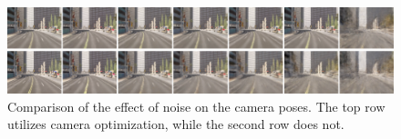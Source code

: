 \begin{figure}[!h]
    \centering
    \includegraphics[width=1.0\textwidth]{figures/noise-baseline-segments.png}
    \caption{Comparison of the effect of noise on the camera poses. The top row utilizes camera optimization, while the second row does not.}
    \label{fig:noise-baseline-segments}
\end{figure}